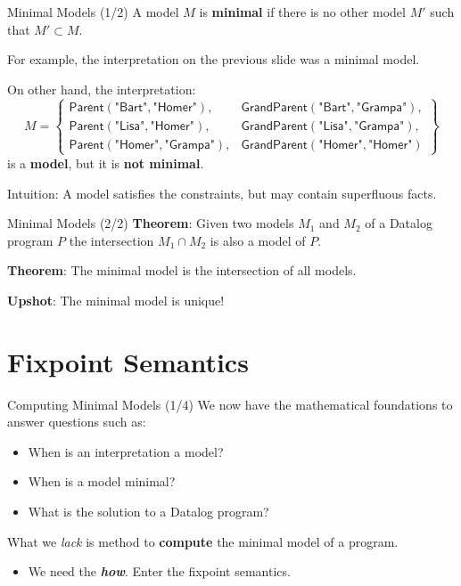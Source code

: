 \begin{frame}{Minimal Models (1/2)}
A model $M$ is \textbf{minimal} if there is no other model $M'$ such that $M'
\subset M$.

\pause

For example, the interpretation on the previous slide was a minimal model.

\pause

On other hand, the interpretation:
$$
M = \left\{
\begin{array}{ll}
\textsf{Parent}(\textsf{"Bart"}, \textsf{"Homer"}),     & \textsf{GrandParent}(\textsf{"Bart"}, \textsf{"Grampa"}), \\
\textsf{Parent}(\textsf{"Lisa"}, \textsf{"Homer"}),     & \textsf{GrandParent}(\textsf{"Lisa"}, \textsf{"Grampa"}), \\
\textsf{Parent}(\textsf{"Homer"}, \textsf{"Grampa"}),   & \textsf{GrandParent}(\textsf{"Homer"}, \textsf{"Homer"})
\end{array}\right\}
$$
is a \textbf{model}, but it is \textbf{not minimal}.

\pause

Intuition: A model satisfies the constraints, but may contain superfluous facts.
\end{frame}

\begin{frame}{Minimal Models (2/2)}
\textbf{Theorem}: Given two models $M_1$ and $M_2$ of a Datalog program $P$ the
intersection $M_1 \cap M_2$ is also a model of $P$. 

\textbf{Theorem}: The minimal model is the intersection of all models.

\textbf{Upshot}: The minimal model is unique!
\end{frame}

\section{Fixpoint Semantics}

\begin{frame}{Computing Minimal Models (1/4)}
We now have the mathematical foundations to answer questions such as:
\begin{itemize}
\item When is an interpretation a model?
\item When is a model minimal?
\item What is the solution to a Datalog program?
\end{itemize}

\pause

What we \emph{lack} is method to \textbf{compute} the minimal model of a program.
\begin{itemize}
    \item We need the \textbf{\emph{how}}. Enter the fixpoint semantics.
\end{itemize}
\end{frame}

